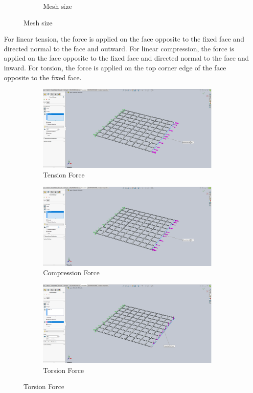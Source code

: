 \documentclass[12pt, letterpaper]{article}
\begin{document}
\begin{figure}[H]
\begin{subfigure}[t]{.3\linewidth}
		\caption{Mesh size}
		\label{fig:settings-mesh}
	\end{subfigure}
\end{figure}

For linear tension, the force is applied on the face opposite to the fixed face and directed normal to the face and outward. 
For linear compression, the force is applied on the face opposite to the fixed face and directed normal to the face and inward.
For torsion, the force is applied on the top corner edge of the face opposite to the fixed face.

\begin{figure}[H]
	\centering
	\caption{Applied Loads}
	\label{fig:sim-loads}
	\begin{subfigure}[t]{.8\linewidth}
		\includegraphics[width=\linewidth]{./procedure/tension-force}
		\caption{Tension Force}
	\end{subfigure}
	\begin{subfigure}[t]{.8\linewidth}
		\includegraphics[width=\linewidth]{./procedure/compression-force}
		\caption{Compression Force}
	\end{subfigure}
	\begin{subfigure}[t]{.8\linewidth}
		\includegraphics[width=\linewidth]{./procedure/torsion-force}
		\caption{Torsion Force}
	\end{subfigure}
\end{figure}
\end{document}

